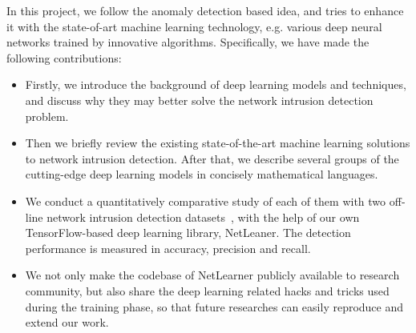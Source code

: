 In this project, we follow the anomaly detection based idea, and tries to enhance it with the
state-of-art machine learning technology, e.g. various deep neural networks trained by innovative algorithms.
Specifically, we have made the following contributions:
\begin{itemize}
    \item Firstly, we introduce the background of deep learning models and techniques,
        and discuss why they may better solve the network intrusion detection problem.
    \item Then we briefly review the existing state-of-the-art machine learning solutions to network intrusion detection.
        After that, we describe several groups of the cutting-edge deep learning models
        in concisely mathematical languages.
    \item We conduct a quantitatively comparative study of each of them with
        two off-line network intrusion detection datasets~\cite{NSL-KDD, UNSW},
        with the help of our own TensorFlow-based deep learning library, NetLeaner.
        The detection performance is measured in accuracy, precision and recall.
    \item We not only make the codebase of NetLearner publicly available to research community,
        but also share the deep learning related hacks and tricks used during the training phase,
        so that future researches can easily reproduce and extend our work.
\end{itemize}

